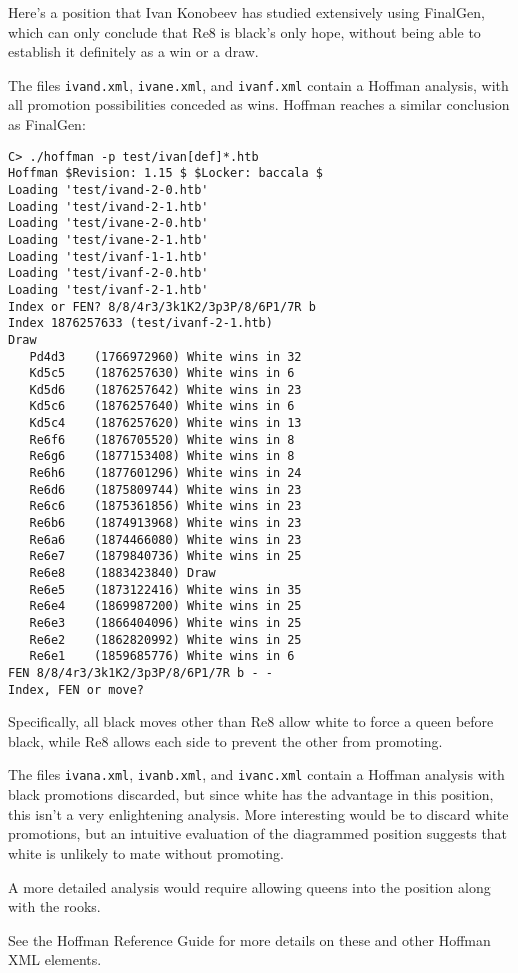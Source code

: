 \documentclass[11pt]{article}
\begin{document}

Here's a position that Ivan Konobeev has studied extensively using
FinalGen, which can only conclude that Re8 is black's only hope,
without being able to establish it definitely as a win or a draw.

\showboard

The files {\tt ivand.xml}, {\tt ivane.xml}, and {\tt ivanf.xml}
contain a Hoffman analysis, with all promotion possibilities conceded
as wins.  Hoffman reaches a similar conclusion as FinalGen:

\begin{verbatim}
C> ./hoffman -p test/ivan[def]*.htb
Hoffman $Revision: 1.15 $ $Locker: baccala $
Loading 'test/ivand-2-0.htb'
Loading 'test/ivand-2-1.htb'
Loading 'test/ivane-2-0.htb'
Loading 'test/ivane-2-1.htb'
Loading 'test/ivanf-1-1.htb'
Loading 'test/ivanf-2-0.htb'
Loading 'test/ivanf-2-1.htb'
Index or FEN? 8/8/4r3/3k1K2/3p3P/8/6P1/7R b
Index 1876257633 (test/ivanf-2-1.htb)
Draw
   Pd4d3    (1766972960) White wins in 32
   Kd5c5    (1876257630) White wins in 6
   Kd5d6    (1876257642) White wins in 23
   Kd5c6    (1876257640) White wins in 6
   Kd5c4    (1876257620) White wins in 13
   Re6f6    (1876705520) White wins in 8
   Re6g6    (1877153408) White wins in 8
   Re6h6    (1877601296) White wins in 24
   Re6d6    (1875809744) White wins in 23
   Re6c6    (1875361856) White wins in 23
   Re6b6    (1874913968) White wins in 23
   Re6a6    (1874466080) White wins in 23
   Re6e7    (1879840736) White wins in 25
   Re6e8    (1883423840) Draw
   Re6e5    (1873122416) White wins in 35
   Re6e4    (1869987200) White wins in 25
   Re6e3    (1866404096) White wins in 25
   Re6e2    (1862820992) White wins in 25
   Re6e1    (1859685776) White wins in 6
FEN 8/8/4r3/3k1K2/3p3P/8/6P1/7R b - -
Index, FEN or move? 
\end{verbatim}

Specifically, all black moves other than Re8 allow white to force
a queen before black, while Re8 allows each side to prevent the
other from promoting.

The files {\tt ivana.xml}, {\tt ivanb.xml}, and {\tt ivanc.xml}
contain a Hoffman analysis with black promotions discarded, but since
white has the advantage in this position, this isn't a very
enlightening analysis.  More interesting would be to discard white
promotions, but an intuitive evaluation of the diagrammed position
suggests that white is unlikely to mate without promoting.

A more detailed analysis would require allowing queens into
the position along with the rooks.


See the Hoffman Reference Guide for more details on these and other
 Hoffman XML elements.
\end{document}
